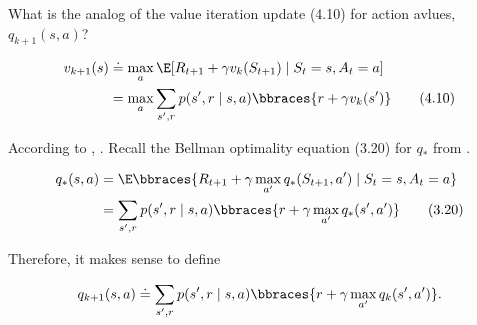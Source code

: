 
\begin{exercise}[Exercise 4.10]

What is the analog of the value iteration update (4.10) for action avlues, $q_{k+1}(s, a)$?

\begin{align*}
    v_{k+1}(s)
    & \doteq
    \max_a
        \E[R_{t+1} + \gamma v_k(S_{t+1}) \mid S_t = s, A_t = a] \\
    & =
    \max_a
        \sum_{s^\prime, r}
            p(s^\prime, r \mid s, a)
            \bbraces{r + \gamma v_k(s^\prime)} \tag{4.10}
\end{align*}

\end{exercise}


\begin{solution}

According to \cite*[page 83]{SuttonRichardS2018Rl:a}, .
Recall the Bellman optimality equation (3.20) for $q_\ast$ from \cite*[page 64]{SuttonRichardS2018Rl:a}.

\begin{align*}
    q_\ast(s, a)
    & =
    \E
    \bbraces
    {
        R_{t+1} + \gamma \max_{a^\prime} q_\ast(S_{t+1}, a^\prime)
        \mid
        S_t = s, A_t = a
    } \\
    & =
    \sum_{s^\prime, r}
        p(s^\prime, r \mid s, a)
        \bbraces
        {
            r + \gamma \max_{a^\prime} q_\ast(s^\prime, a^\prime)
        } \tag{3.20}
\end{align*}

Therefore, it makes sense to define

\begin{align*}
    q_{k+1}(s, a)
    \doteq
    \sum_{s^\prime, r}
        p(s^\prime, r \mid s, a)
        \bbraces
        {
            r + \gamma \max_{a^\prime} q_k(s^\prime, a^\prime)
        }.
\end{align*}

\end{solution}

